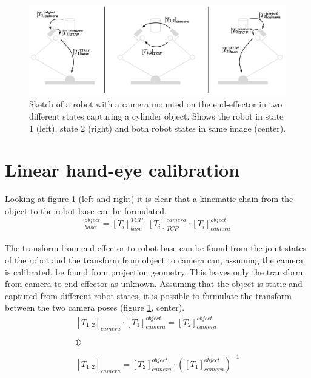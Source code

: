 \begin{figure}[htb]
	\begin{center}
		\includegraphics[width=\textwidth,trim=0 0 0 0]{graphics/03_calibration/hand_eye_transforms.pdf}%
		\caption{Sketch of a robot with a camera mounted on the end-effector in two different states capturing a cylinder object. Shows the robot in state 1 (left), state 2 (right) and both robot states in same image (center).}\label{fig:hand_eye_transforms}
		
	\end{center}
\end{figure}

\section{Linear hand-eye calibration}
\noindent Looking at figure \ref{fig:hand_eye_transforms} (left and right) it is clear that a kinematic chain from the object to the robot base can be formulated.\\

\begin{equation}
	[T_{i}]_{base}^{object} = [T_{i}]_{base}^{TCP} \cdot [T_{i}]_{TCP}^{camera} \cdot [T_{i}]_{camera}^{object}
\end{equation} \\

\noindent The transform from end-effector to robot base can be found from the joint states of the robot and the transform from object to camera can, assuming the camera is calibrated, be found from projection geometry. This leaves only the transform from camera to end-effector as unknown. Assuming that the object is static and captured from different robot states, it is possible to formulate the transform between the two camera poses (figure \ref{fig:hand_eye_transforms}, center).\\

\begin{equation}\label{eq:object_camera}
\begin{matrix}
[T_{1,2}]_{camera} \cdot [T_{1}]_{camera}^{object} = [T_{2}]_{camera}^{object} \\
\\  
\Updownarrow \\ 
\\ 
[T_{1,2}]_{camera} = [T_{2}]_{camera}^{object} \cdot ([T_{1}]_{camera}^{object})^{-1}
\end{matrix}
\end{equation}\\ 

